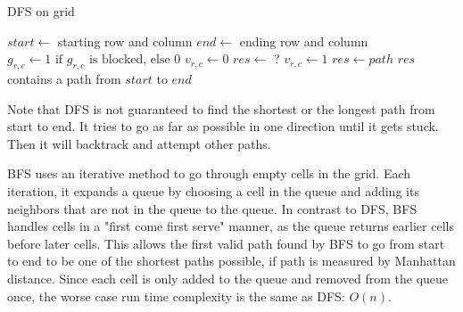\documentclass{article}
\begin{document}
    \begin{algorithm}[H]
        \caption{DFS on grid}
        \begin{algorithmic}[1]
            \State $start \gets$ starting row and column
            \State $end \gets$ ending row and column
            \State $g_{r, c} \gets 1 \textrm{ if } g_{r, c} \textrm{ is blocked, else } 0$
            \State $v_{r, c} \gets 0$
            \State $res \gets $ ?
                    \State \Return
                \EndIf
                \State $v_{r, c} \gets 1$
                    \State $res \gets path$
                    \State \Return
                \EndIf
                    \State {}
                \EndFor
            \EndFunction
            \State {}
            \State $res$ contains a path from $start$ to $end$
        \end{algorithmic}
    \end{algorithm}

    Note that DFS is not guaranteed to find the shortest or the longest path from start to end. It tries to go as far as possible in one direction until it gets stuck. Then it will backtrack and attempt other paths.

    BFS uses an iterative method to go through empty cells in the grid. Each iteration, it expands a queue by choosing a cell in the queue and adding its neighbors that are not in the queue to the queue. In contrast to DFS, BFS handles cells in a "first come first serve" manner, as the queue returns earlier cells before later cells. This allows the first valid path found by BFS to go from start to end to be one of the shortest paths possible, if path is measured by Manhattan distance. Since each cell is only added to the queue and removed from the queue once, the worse case run time complexity is the same as DFS: $O(n)$.
\end{document}
